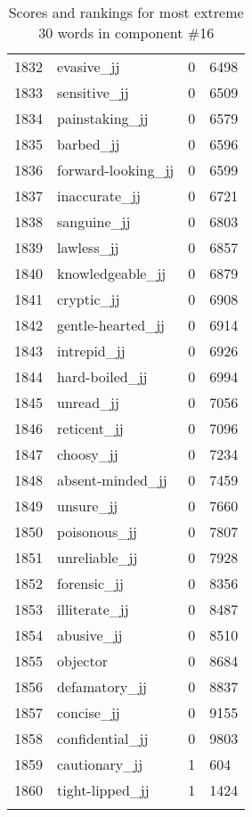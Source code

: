 \begin{longtable}[!htbp]{| rlr@{.}l |}
    1832 & evasive\_jj & 0 & 6498 \\
    1833 & sensitive\_jj & 0 & 6509 \\
    1834 & painstaking\_jj & 0 & 6579 \\
    1835 & barbed\_jj & 0 & 6596 \\
    1836 & forward-looking\_jj & 0 & 6599 \\
    1837 & inaccurate\_jj & 0 & 6721 \\
    1838 & sanguine\_jj & 0 & 6803 \\
    1839 & lawless\_jj & 0 & 6857 \\
    1840 & knowledgeable\_jj & 0 & 6879 \\
    1841 & cryptic\_jj & 0 & 6908 \\
    1842 & gentle-hearted\_jj & 0 & 6914 \\
    1843 & intrepid\_jj & 0 & 6926 \\
    1844 & hard-boiled\_jj & 0 & 6994 \\
    1845 & unread\_jj & 0 & 7056 \\
    1846 & reticent\_jj & 0 & 7096 \\
    1847 & choosy\_jj & 0 & 7234 \\
    1848 & absent-minded\_jj & 0 & 7459 \\
    1849 & unsure\_jj & 0 & 7660 \\
    1850 & poisonous\_jj & 0 & 7807 \\
    1851 & unreliable\_jj & 0 & 7928 \\
    1852 & forensic\_jj & 0 & 8356 \\
    1853 & illiterate\_jj & 0 & 8487 \\
    1854 & abusive\_jj & 0 & 8510 \\
    1855 & objector & 0 & 8684 \\
    1856 & defamatory\_jj & 0 & 8837 \\
    1857 & concise\_jj & 0 & 9155 \\
    1858 & confidential\_jj & 0 & 9803 \\
    1859 & cautionary\_jj & 1 & 604 \\
    1860 & tight-lipped\_jj & 1 & 1424 \\
    \hline
    \caption{Scores and rankings for most extreme 30 words in component \#16} \\
\end{longtable}
